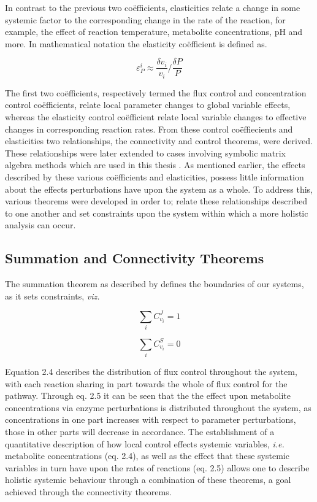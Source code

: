 In contrast to the previous two co\"efficients, elasticities relate a change in some systemic factor to the corresponding change in the rate of the reaction, for example, the effect of reaction temperature, metabolite concentrations, pH and more. In mathematical notation the elasticity co\"efficient is defined as.

\begin{equation}
\varepsilon^{i}_{P}\approx\dfrac{\delta v_{i}}{v_{i}}/\dfrac{\delta P}{P}
\end{equation}


The first two co\"efficients, respectively termed the flux control and concentration control co\"efficients, relate local parameter changes to global variable effects, whereas the elasticity control co\"efficient relate local variable changes to effective changes in corresponding reaction rates. From these control co\"effiecients and elasticities two relationships, the connectivity and control theorems, were derived. These relationships were later extended to cases involving symbolic matrix algebra methods which are used in this thesis \cite{Fell1992,Kacser1995,Ehlde1997,Hofmeyr2001}. As mentioned earlier, the effects described by these various co\"efficients and elasticities, possess little information about the effects perturbations have upon the system as a whole. To address this, various theorems were developed in order to; relate these relationships described to one another and  set constraints upon the system within which a more holistic analysis can occur.

\subsection{Summation and Connectivity Theorems}
The summation theorem as described by \citeauthor{Kacser1979,Rapoport1974} defines the boundaries of our systems, as it sets constraints, \textit{viz.} 

\begin{equation}
\sum_{i}C_{v_i}^J=1
\end{equation}

\begin{equation}
\sum_{i}C_{v_i}^S=0
\end{equation}

Equation 2.4 describes the distribution of flux control throughout the system, with each reaction sharing in part towards the whole of flux control for the pathway. Through eq. 2.5 it can be seen that the the effect upon metabolite concentrations via enzyme perturbations is distributed throughout the system, as concentrations in one part increases with respect to parameter perturbations, those in other parts will decrease in accordance. The establishment of a quantitative description of how local control effects systemic variables, \textit{i.e.} metabolite concentrations (eq. 2.4), as well as the effect that these systemic variables in turn have upon the rates of reactions (eq. 2.5) allows one to describe holistic systemic behaviour through a combination of these theorems, a goal achieved through the connectivity theorems.

